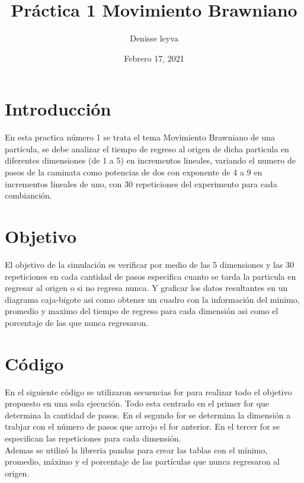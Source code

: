 \documentclass{article}
\title{Práctica 1 Movimiento Brawniano}
\author{Denisse leyva}
\date{Febrero 17, 2021}
\begin{document}
\maketitle

\section{Introducción}
En esta practica número 1 se trata el tema Movimiento Brawniano de una partícula, se debe analizar el tiempo de regreso al origen de dicha particula en diferentes dimensiones (de 1 a 5) en incrementos lineales, variando el numero de pasos de la caminata como potencias de dos con exponente de 4 a 9 en  incrementos lineales de uno, con 30 repeticiones del experimento para cada combianción.  


\section{Objetivo}
El objetivo de la simulación es verificar por medio de las 5 dimensiones y las 30 repeticiones en cada cantidad de pasos especifica cuanto se tarda la particula en regresar al origen o si no regresa nunca. 
Y graficar los datos resultantes en un diagrama caja-bigote asi como obtener un cuadro con la información del minimo, promedio y maximo del tiempo de regreso para cada dimensión asi como el porcentaje de las que nunca regresaron.


\section{Código}
En el siguiente código se utilizaron secuencias for para realizar todo el objetivo propuesto en una sola ejecución.
Todo esta centrado en el primer for que determina la cantidad de pasos. En el segundo for se determina la dimensión a trabjar con el número de pasos que arrojo el for anterior. En el tercer for se especifican las repeticiones para cada dimensión.\\
Ademas se utilizó la libreria pandas para crear las tablas con el mínimo, promedio, máximo y el porcentaje de las partículas que nunca regresaron al origen.\\
\end{document}
